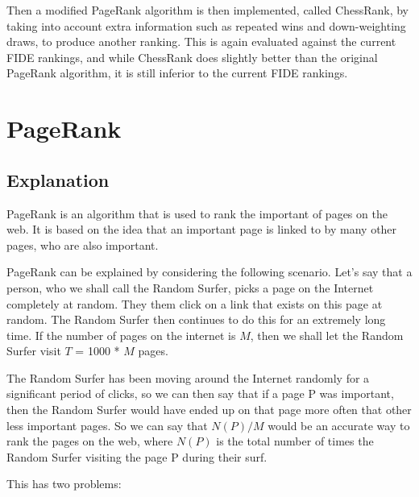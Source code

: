 \documentclass[pdftex,11pt,a4paper]{report}
\begin{document}
Then a modified PageRank algorithm is then implemented, called ChessRank,
by taking into account extra information such as repeated wins and down-weighting
draws, to produce another ranking. This is again evaluated against the current FIDE rankings,
and while ChessRank does slightly better than the original PageRank algorithm, it is still inferior
to the current FIDE rankings.

\chapter{PageRank}

\section{Explanation}

PageRank is an algorithm that is used to rank the important of pages on the web.
It is based on the idea that an important page is linked to by many other pages, who
are also important. 

PageRank can be explained by considering the following scenario.
Let's say that a person, who we shall call the Random Surfer, picks a page on the Internet completely at random.
They them click on a link that exists on this page at random. The Random Surfer then
continues to do this for an extremely long time. If the number of pages on the internet is $M$, then
we shall let the Random Surfer visit $T$ = 1000 * $M$ pages.

The Random Surfer has been moving around the Internet randomly for a significant
period of clicks, so we can then say that if a page P was important, then the Random Surfer
would have ended up on that page more often that other less important pages. So we can say that
$N(P) / M$ would be an accurate way to rank the pages on the web, where $N(P)$ is the total
number of times the Random Surfer visiting the page P during their surf.

This has two problems:
\end{document}
